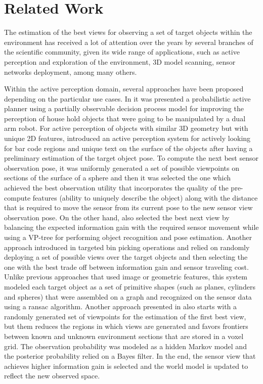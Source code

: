 \section{Related Work}\label{sec:related-work}

The estimation of the best views for observing a set of target objects within the environment has received a lot of attention over the years by several branches of the scientific community, given its wide range of applications, such as active perception and exploration of the environment, 3D model scanning, sensor networks deployment, among many others.

Within the active perception domain, several approaches have been proposed depending on the particular use cases. In \cite{Eidenberger2010} it was presented a probabilistic active planner using a partially observable decision process model for improving the perception of house hold objects that were going to be manipulated by a dual arm robot. For active perception of objects with similar 3D geometry but with unique 2D features, \cite{Stampfer2012} introduced an active perception system for actively looking for bar code regions and unique text on the surface of the objects after having a preliminary estimation of the target object pose. To compute the next best sensor observation pose, it was uniformly generated a set of possible viewpoints on sections of the surface of a sphere and then it was selected the one which achieved the best observation utility that incorporates the quality of the pre-compute features (ability to uniquely describe the object) along with the distance that is required to move the sensor from its current pose to the new sensor view observation pose. On the other hand, \cite{Atanasov2014} also selected the best next view by balancing the expected information gain with the required sensor movement while using a VP-tree for performing object recognition and pose estimation. Another approach introduced in \cite{Nieuwenhuisen2013,Holz2014} targeted bin picking operations and relied on randomly deploying a set of possible views over the target objects and then selecting the one with the best trade off between information gain and sensor traveling cost. Unlike previous approaches that used image or geometric features, this system modeled each target object as a set of primitive shapes (such as planes, cylinders and spheres) that were assembled on a graph and recognized on the sensor data using a \gls{ransac} algorithm. Another approach presented in \cite{Potthast2014} also starts with a randomly generated set of viewpoints for the estimation of the first best view, but them reduces the regions in which views are generated and favors frontiers between known and unknown environment sections that are stored in a voxel grid. The observation probability was modeled as a hidden Markov model and the posterior probability relied on a Bayes filter. In the end, the sensor view that achieves higher information gain is selected and the world model is updated to reflect the new observed space.%

